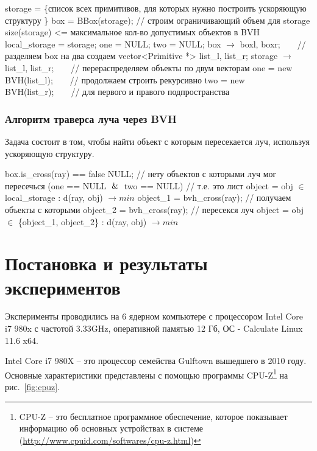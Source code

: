 \documentclass[12pt, a4paper, utf8]{article}
\begin{document}
\vspace{-0.6cm}
\begin{codebox}
\li storage = \{список всех примитивов, для которых нужно построить ускоряющую структуру \}
\li box = BBox(storage);     // строим ограничивающий объем для storage
\li \If size(storage) <= максимальное кол-во допустимых объектов в BVH
\li \Then
\li local\_storage = storage;
\li one = NULL;
\li two = NULL;
\li \Else
\li box $\to$ boxl, boxr;\ \ \ \ // разделяем box на два
\li создаем vector<Primitive *> list\_l, list\_r;
\li storage $\to$ list\_l, list\_r;\ \ \ \ // перераспределяем объекты по двум векторам
\li one = new BVH(list\_l);\ \ \ \ // продолжаем строить рекурсивно
\li two = new BVH(list\_r);\ \ \ \ // для первого и правого подпространства
\end{codebox}

\subsubsection{Алгоритм траверса луча через BVH}

Задача состоит в том, чтобы найти объект с которым пересекается луч, используя ускоряющую структуру.

\begin{codebox}
\li \If box.is\_cross(ray) == false
\li \Then 
\li \Return NULL; // нету объектов с которыми луч мог пересечься
\li \Else
\li \If (one == NULL $\And$ two == NULL) // т.е. это лист
\li \Then 
\li \Return object = obj $\in$ local\_storage : d(ray, obj) $\to min$
\li \Else
\li object\_1 = bvh\_cross(ray); // получаем объекты с которыми
\li object\_2 = bvh\_cross(ray); // пересекся луч
\li \Return object = obj $\in$ \{object\_1, object\_2\} : d(ray, obj) $\to min$
\end{codebox}


\newpage
\section{Постановка и результаты экспериментов}

Эксперименты проводились на 6 ядерном компьютере с процессором Intel Core i7 980x с частотой 3.33GHz, оперативной памятью 12 Гб, ОС - Calculate Linux 11.6 x64. 

Intel Core i7 980X -- это процессор семейства Gulftown вышедшего в 2010 году. Основные характеристики представлены с помощью программы CPU-Z\footnote{CPU-Z -- это бесплатное программное обеспечение, которое показывает информацию об основных устройствах в системе (\href{http://www.cpuid.com/softwares/cpu-z.html}{http://www.cpuid.com/softwares/cpu-z.html})} на рис.~\ref{fig:cpuz}.
\end{document}
